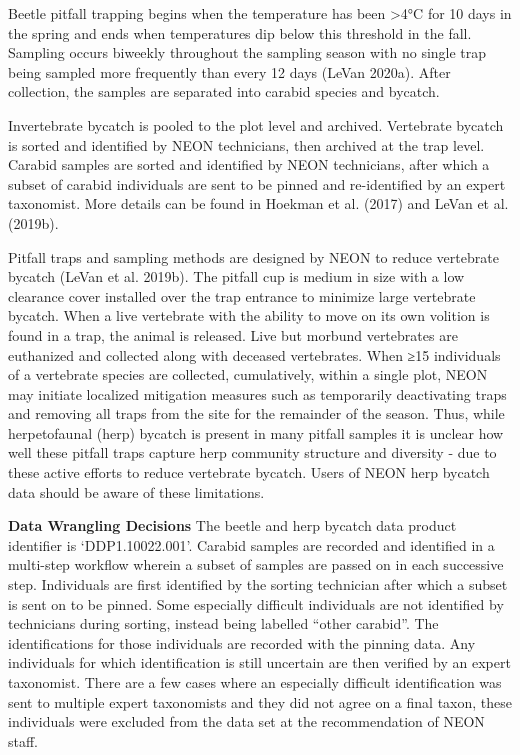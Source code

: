 \documentclass[
  12pt,
]{article}
\begin{document}
Beetle pitfall trapping begins when the temperature has been \textgreater4°C for 10 days in the spring and ends when temperatures dip below this threshold in the fall. Sampling occurs biweekly throughout the sampling season with no single trap being sampled more frequently than every 12 days (LeVan 2020a). After collection, the samples are separated into carabid species and bycatch.

Invertebrate bycatch is pooled to the plot level and archived. Vertebrate bycatch is sorted and identified by NEON technicians, then archived at the trap level. Carabid samples are sorted and identified by NEON technicians, after which a subset of carabid individuals are sent to be pinned and re-identified by an expert taxonomist. More details can be found in Hoekman et al. (2017) and LeVan et al. (2019b).

Pitfall traps and sampling methods are designed by NEON to reduce vertebrate bycatch (LeVan et al. 2019b). The pitfall cup is medium in size with a low clearance cover installed over the trap entrance to minimize large vertebrate bycatch. When a live vertebrate with the ability to move on its own volition is found in a trap, the animal is released. Live but morbund vertebrates are euthanized and collected along with deceased vertebrates. When ≥15 individuals of a vertebrate species are collected, cumulatively, within a single plot, NEON may initiate localized mitigation measures such as temporarily deactivating traps and removing all traps from the site for the remainder of the season. Thus, while herpetofaunal (herp) bycatch is present in many pitfall samples it is unclear how well these pitfall traps capture herp community structure and diversity - due to these active efforts to reduce vertebrate bycatch. Users of NEON herp bycatch data should be aware of these limitations.

\textbf{Data Wrangling Decisions} The beetle and herp bycatch data product identifier is `DDP1.10022.001'. Carabid samples are recorded and identified in a multi-step workflow wherein a subset of samples are passed on in each successive step. Individuals are first identified by the sorting technician after which a subset is sent on to be pinned. Some especially difficult individuals are not identified by technicians during sorting, instead being labelled ``other carabid''. The identifications for those individuals are recorded with the pinning data. Any individuals for which identification is still uncertain are then verified by an expert taxonomist. There are a few cases where an especially difficult identification was sent to multiple expert taxonomists and they did not agree on a final taxon, these individuals were excluded from the data set at the recommendation of NEON staff.
\end{document}
